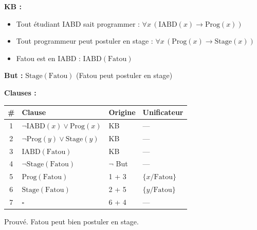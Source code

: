 \documentclass[11pt,a4paper]{article}
\newcommand{\cmark}{\ding{51}}
\begin{document}
\begin{exemplebox}
\textbf{KB :}
\begin{itemize}[nosep]
    \item Tout étudiant IABD sait programmer : $\forall x \, (\text{IABD}(x) \rightarrow \text{Prog}(x))$
    \item Tout programmeur peut postuler en stage : $\forall x \, (\text{Prog}(x) \rightarrow \text{Stage}(x))$
    \item Fatou est en IABD : $\text{IABD}(\text{Fatou})$
\end{itemize}

\textbf{But :} $\text{Stage}(\text{Fatou})$ (Fatou peut postuler en stage)

\textbf{Clauses :}

\begin{center}
\begin{tabular}{clll}
\toprule
\textbf{\#} & \textbf{Clause} & \textbf{Origine} & \textbf{Unificateur} \\
\midrule
1 & $\neg\text{IABD}(x) \lor \text{Prog}(x)$ & KB & --- \\
2 & $\neg\text{Prog}(y) \lor \text{Stage}(y)$ & KB & --- \\
3 & $\text{IABD}(\text{Fatou})$ & KB & --- \\
4 & $\neg\text{Stage}(\text{Fatou})$ & $\neg$ But & --- \\
\midrule
5 & $\text{Prog}(\text{Fatou})$ & 1 + 3 & $\{x/\text{Fatou}\}$ \\
6 & $\text{Stage}(\text{Fatou})$ & 2 + 5 & $\{y/\text{Fatou}\}$ \\
7 & $\square$ & 6 + 4 & --- \quad \cmark \\
\bottomrule
\end{tabular}
\end{center}

Prouvé. Fatou peut bien postuler en stage.
\end{exemplebox}
\end{document}
